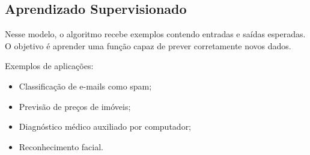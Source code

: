 \subsection{Aprendizado Supervisionado}

Nesse modelo, o algoritmo recebe exemplos contendo entradas e saídas esperadas. O objetivo é
aprender uma função capaz de prever corretamente novos dados.

Exemplos de aplicações:

\begin{itemize}
    \item Classificação de e-mails como spam;
    \item Previsão de preços de imóveis;
    \item Diagnóstico médico auxiliado por computador;
    \item Reconhecimento facial.
\end{itemize}
 